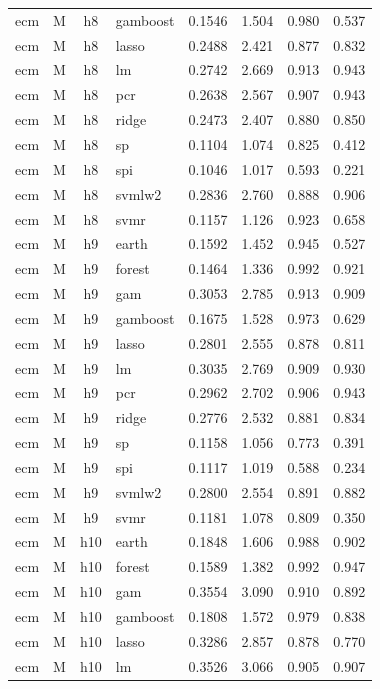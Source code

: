 \begin{ThreePartTable}
\begin{longtable}[t]{llclcccc}
ecm & M & h8 & gamboost & 0.1546 & 1.504 & 0.980 & 0.537\\
ecm & M & h8 & lasso & 0.2488 & 2.421 & 0.877 & 0.832\\
ecm & M & h8 & lm & 0.2742 & 2.669 & 0.913 & 0.943\\
ecm & M & h8 & pcr & 0.2638 & 2.567 & 0.907 & 0.943\\
ecm & M & h8 & ridge & 0.2473 & 2.407 & 0.880 & 0.850\\
ecm & M & h8 & sp & 0.1104 & 1.074 & 0.825 & 0.412\\
ecm & M & h8 & spi & 0.1046 & 1.017 & 0.593 & 0.221\\
ecm & M & h8 & svmlw2 & 0.2836 & 2.760 & 0.888 & 0.906\\
ecm & M & h8 & svmr & 0.1157 & 1.126 & 0.923 & 0.658\\
\addlinespace
ecm & M & h9 & earth & 0.1592 & 1.452 & 0.945 & 0.527\\
ecm & M & h9 & forest & 0.1464 & 1.336 & 0.992 & 0.921\\
ecm & M & h9 & gam & 0.3053 & 2.785 & 0.913 & 0.909\\
ecm & M & h9 & gamboost & 0.1675 & 1.528 & 0.973 & 0.629\\
ecm & M & h9 & lasso & 0.2801 & 2.555 & 0.878 & 0.811\\
ecm & M & h9 & lm & 0.3035 & 2.769 & 0.909 & 0.930\\
ecm & M & h9 & pcr & 0.2962 & 2.702 & 0.906 & 0.943\\
ecm & M & h9 & ridge & 0.2776 & 2.532 & 0.881 & 0.834\\
ecm & M & h9 & sp & 0.1158 & 1.056 & 0.773 & 0.391\\
ecm & M & h9 & spi & 0.1117 & 1.019 & 0.588 & 0.234\\
ecm & M & h9 & svmlw2 & 0.2800 & 2.554 & 0.891 & 0.882\\
ecm & M & h9 & svmr & 0.1181 & 1.078 & 0.809 & 0.350\\
\addlinespace
ecm & M & h10 & earth & 0.1848 & 1.606 & 0.988 & 0.902\\
ecm & M & h10 & forest & 0.1589 & 1.382 & 0.992 & 0.947\\
ecm & M & h10 & gam & 0.3554 & 3.090 & 0.910 & 0.892\\
ecm & M & h10 & gamboost & 0.1808 & 1.572 & 0.979 & 0.838\\
ecm & M & h10 & lasso & 0.3286 & 2.857 & 0.878 & 0.770\\
ecm & M & h10 & lm & 0.3526 & 3.066 & 0.905 & 0.907\\

\end{longtable}
\end{ThreePartTable}
